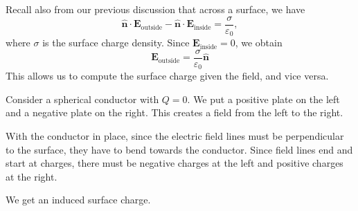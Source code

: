 \documentclass[a4paper]{article}
\begin{document}
Recall also from our previous discussion that across a surface, we have
\[
  \hat{\mathbf{n}}\cdot \mathbf{E}_\text{outside} - \hat{\mathbf{n}}\cdot \mathbf{E}_\text{inside} = \frac{\sigma}{\varepsilon_0},
\]
where $\sigma$ is the surface charge density. Since $\mathbf{E}_\text{inside} = 0$, we obtain
\[
  \mathbf{E}_\text{outside} = \frac{\sigma}{\varepsilon_0}\hat{\mathbf{n}}
\]
This allows us to compute the surface charge given the field, and vice versa.

\begin{eg}
  Consider a spherical conductor with $Q = 0$. We put a positive plate on the left and a negative plate on the right. This creates a field from the left to the right.

  With the conductor in place, since the electric field lines must be perpendicular to the surface, they have to bend towards the conductor. Since field lines end and start at charges, there must be negative charges at the left and positive charges at the right.
  \begin{center}
  \end{center}
  We get an induced surface charge.
\end{eg}
\end{document}

